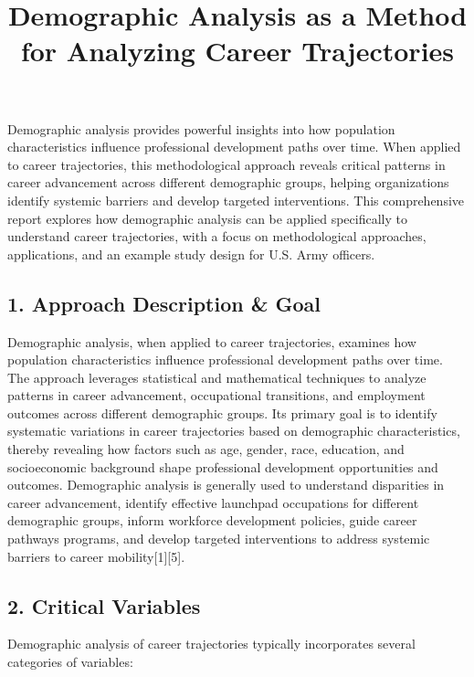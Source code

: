 \documentclass[
  letterpaper,
  DIV=11,
  numbers=noendperiod]{scrartcl}
\title{Demographic Analysis as a Method for Analyzing Career
Trajectories}
\author{}
\date{}
\begin{document}
\maketitle


Demographic analysis provides powerful insights into how population
characteristics influence professional development paths over time. When
applied to career trajectories, this methodological approach reveals
critical patterns in career advancement across different demographic
groups, helping organizations identify systemic barriers and develop
targeted interventions. This comprehensive report explores how
demographic analysis can be applied specifically to understand career
trajectories, with a focus on methodological approaches, applications,
and an example study design for U.S. Army officers.

\subsection{1. Approach Description \&
Goal}\label{approach-description-goal}

Demographic analysis, when applied to career trajectories, examines how
population characteristics influence professional development paths over
time. The approach leverages statistical and mathematical techniques to
analyze patterns in career advancement, occupational transitions, and
employment outcomes across different demographic groups. Its primary
goal is to identify systematic variations in career trajectories based
on demographic characteristics, thereby revealing how factors such as
age, gender, race, education, and socioeconomic background shape
professional development opportunities and outcomes. Demographic
analysis is generally used to understand disparities in career
advancement, identify effective launchpad occupations for different
demographic groups, inform workforce development policies, guide career
pathways programs, and develop targeted interventions to address
systemic barriers to career mobility{[}1{]}{[}5{]}.

\subsection{2. Critical Variables}\label{critical-variables}

Demographic analysis of career trajectories typically incorporates
several categories of variables:
\end{document}

